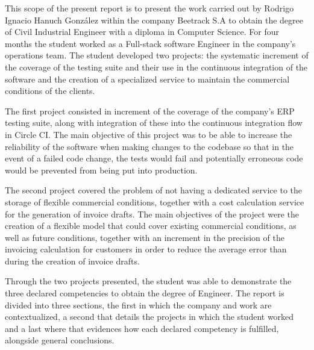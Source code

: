 This scope of the present report is to present the work carried out by Rodrigo Ignacio Hanuch González within the company Beetrack S.A to obtain  the degree of Civil Industrial Engineer with a diploma in Computer Science. For four months the student worked as a Full-stack software Engineer in the company's operations team. The student developed two projects: the systematic increment of the coverage of the testing suite and their use in the continuous integration of the software and the creation of a specialized service to maintain the commercial conditions of the clients.

The first project consisted in increment of the coverage of the company's ERP testing suite, along with integration of these into the continuous integration flow in Circle CI. The main objective of this project was to be able to increase the reliability of the software when making changes to the codebase so that in the event of a failed code change, the tests would fail and potentially erroneous code would be prevented from being put into production.

The second project covered the problem of not having a dedicated service to the storage of flexible commercial conditions, together with a cost calculation service for the generation of invoice drafts. The main objectives of the project were the creation of a flexible model that could cover existing commercial conditions, as well as future conditions, together with an increment in the precision of the invoicing calculation for customers in order to reduce the average error than during the creation of invoice drafts.

Through the two projects presented, the student was able to demonstrate the three declared competencies to obtain the degree of Engineer. The report is divided into three sections, the first in which the company and work are contextualized, a second that details the projects in which the student worked and a last where that evidences how each declared competency is fulfilled, alongside general conclusions.